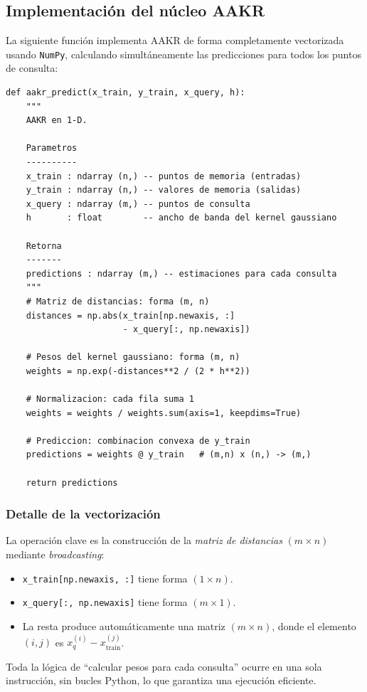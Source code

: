 \documentclass[12pt,a4paper]{article}
\begin{document}
\subsection{Implementaci\'on del n\'ucleo AAKR}

La siguiente funci\'on implementa AAKR de forma completamente vectorizada usando
\texttt{NumPy}, calculando simult\'aneamente las predicciones para todos los puntos
de consulta:

\begin{lstlisting}[caption={Implementaci\'on vectorizada de AAKR en 1-D},
                   label={lst:aakr1d}]
def aakr_predict(x_train, y_train, x_query, h):
    """
    AAKR en 1-D.

    Parametros
    ----------
    x_train : ndarray (n,) -- puntos de memoria (entradas)
    y_train : ndarray (n,) -- valores de memoria (salidas)
    x_query : ndarray (m,) -- puntos de consulta
    h       : float        -- ancho de banda del kernel gaussiano

    Retorna
    -------
    predictions : ndarray (m,) -- estimaciones para cada consulta
    """
    # Matriz de distancias: forma (m, n)
    distances = np.abs(x_train[np.newaxis, :]
                       - x_query[:, np.newaxis])

    # Pesos del kernel gaussiano: forma (m, n)
    weights = np.exp(-distances**2 / (2 * h**2))

    # Normalizacion: cada fila suma 1
    weights = weights / weights.sum(axis=1, keepdims=True)

    # Prediccion: combinacion convexa de y_train
    predictions = weights @ y_train   # (m,n) x (n,) -> (m,)

    return predictions
\end{lstlisting}

\subsubsection*{Detalle de la vectorizaci\'on}

La operaci\'on clave es la construcci\'on de la \emph{matriz de distancias}
$(m \times n)$ mediante \emph{broadcasting}:
\begin{itemize}[leftmargin=2em]
  \item \verb|x_train[np.newaxis, :]| tiene forma $(1 \times n)$.
  \item \verb|x_query[:, np.newaxis]| tiene forma $(m \times 1)$.
  \item La resta produce autom\'aticamente una matriz $(m \times n)$, donde el
        elemento $(i,j)$ es $x_q^{(i)} - x_\text{train}^{(j)}$.
\end{itemize}
Toda la l\'ogica de ``calcular pesos para cada consulta'' ocurre en una sola
instrucci\'on, sin bucles Python, lo que garantiza una ejecuci\'on eficiente.
\end{document}
